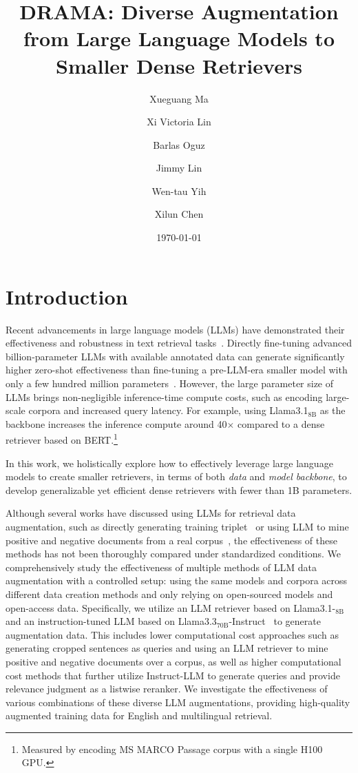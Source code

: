 \documentclass[]{fairmeta}
\title{DRAMA: Diverse Augmentation from Large Language Models to Smaller Dense Retrievers}
\author[2,*,\dagger]{Xueguang Ma}
\author[1]{Xi Victoria Lin}
\author[1]{Barlas Oguz}
\author[2]{Jimmy Lin}
\author[1]{Wen-tau Yih}
\author[1,\dagger]{Xilun Chen}
\affiliation[1]{FAIR at Meta}
\affiliation[2]{University of Waterloo}
\date{\today}
\begin{document}
\maketitle

\section{Introduction}
Recent advancements in large language models (LLMs) have demonstrated their effectiveness and robustness in text retrieval tasks~\citep{muennighoff2024generative, sun-etal-2023-chatgpt, li2024making, behnamghader2024llmvec, lee2025nvembed}.
Directly fine-tuning advanced billion-parameter LLMs with available annotated data can generate significantly higher zero-shot effectiveness than fine-tuning a pre-LLM-era smaller model with only a few hundred million parameters~\citep{ma2024repllama, luo-etal-2024-large}.
However, the large parameter size of LLMs brings non-negligible inference-time compute costs, such as encoding large-scale corpora and increased query latency.
For example,
using Llama3.1$_\text{8B}$ as the backbone increases the inference compute around 40$\times$ compared to a dense retriever based on BERT.\footnote{Measured by encoding MS MARCO Passage corpus with a single H100 GPU.}


In this work, we holistically explore how to effectively leverage large language models to create smaller retrievers, in terms of both \textit{data} and \textit{model backbone}, to develop generalizable yet efficient dense retrievers with fewer than 1B parameters.

Although several works have discussed using LLMs for retrieval data augmentation, such as directly generating training triplet~\citep{wang-etal-2024-improving-text} or 
using LLM to mine positive and negative documents from a real corpus~\citep{lee2024gecko}, the effectiveness of these methods has not been thoroughly compared under standardized conditions.
We comprehensively study the effectiveness of multiple methods of LLM data augmentation with a controlled setup: using the same models and corpora across different data creation methods and only relying on open-sourced models and open-access data.
Specifically, we utilize an LLM retriever based on Llama3.1-$_\text{8B}$ and an instruction-tuned LLM based on Llama3.3$_\text{70B}$-Instruct~\citep{llama3} to generate augmentation data.
This includes lower computational cost approaches such as generating cropped sentences as queries and using an LLM retriever to mine positive and negative documents over a corpus, as well as higher computational cost methods that further utilize Instruct-LLM to generate queries and provide relevance judgment as a listwise reranker.
We investigate the effectiveness of various combinations of these diverse LLM augmentations, providing high-quality augmented training data for English and multilingual retrieval.
\end{document}
